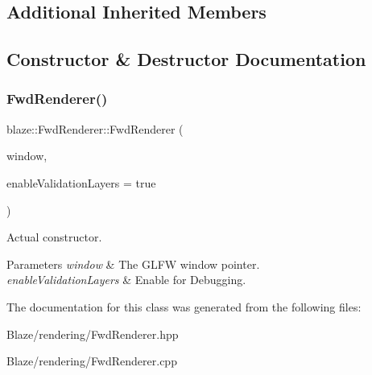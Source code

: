 \subsection*{Additional Inherited Members}


\subsection{Constructor \& Destructor Documentation}
\mbox{\label{classblaze_1_1FwdRenderer_a4930aa617bc159adf645bce6ff5866a5}} 
\subsubsection{\texorpdfstring{Fwd\+Renderer()}{FwdRenderer()}}
{\footnotesize\ttfamily blaze\+::\+Fwd\+Renderer\+::\+Fwd\+Renderer (\begin{DoxyParamCaption}\item[{G\+L\+F\+Wwindow $\ast$}]{window,  }\item[{bool}]{enable\+Validation\+Layers = {\ttfamily true} }\end{DoxyParamCaption})\hspace{0.3cm}{\ttfamily [noexcept]}}



Actual constructor. 


\begin{DoxyParams}{Parameters}
{\em window} & The G\+L\+FW window pointer. \\
\hline
{\em enable\+Validation\+Layers} & Enable for Debugging. \\
\hline
\end{DoxyParams}


The documentation for this class was generated from the following files\+:\begin{DoxyCompactItemize}
\item 
Blaze/rendering/Fwd\+Renderer.\+hpp\item 
Blaze/rendering/Fwd\+Renderer.\+cpp\end{DoxyCompactItemize}
